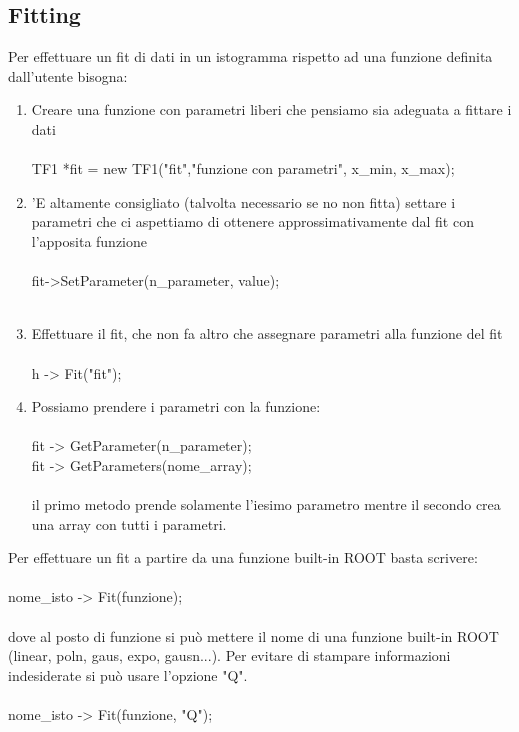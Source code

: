 \documentclass[10pt,a4paper]{article}
\begin{document}
\subsection{Fitting}
Per effettuare un fit di dati in un istogramma rispetto ad una funzione definita dall'utente bisogna:
\begin{enumerate}
	\item Creare una funzione con parametri liberi che pensiamo sia adeguata a fittare i dati\\\\
	TF1 *fit = new TF1("fit","funzione con parametri", x\_min, x\_max);\\
	\item 'E altamente consigliato (talvolta necessario se no non fitta) settare i parametri che ci aspettiamo di ottenere approssimativamente dal fit con l'apposita funzione\\\\
	fit->SetParameter(n\_parameter, value);\\\\
	\item Effettuare il fit, che non fa altro che assegnare parametri alla funzione del fit\\\\
	h -> Fit("fit");\\
	\item Possiamo prendere i parametri con la funzione:\\\\
	 fit -> GetParameter(n\_parameter);\\
	 fit -> GetParameters(nome\_array);\\\\
	 il primo metodo prende solamente l'iesimo parametro mentre il secondo crea una array con tutti i parametri.\\
\end{enumerate}
Per effettuare un fit a partire da una funzione built-in ROOT basta scrivere:\\\\
nome\_isto -> Fit(funzione);\\\\
dove al posto di funzione si può mettere il nome di una funzione built-in ROOT (linear, poln, gaus, expo, gausn...). Per evitare di stampare informazioni indesiderate si può usare l'opzione "Q".\\\\
nome\_isto -> Fit(funzione, "Q");\\\\
\end{document}
